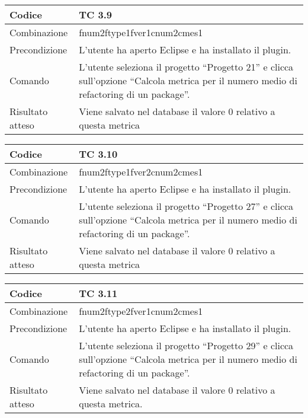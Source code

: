 \begin{table}[ht]
\begin{tabular}{|p{3cm}|p{9cm}|}
\hline
\cellcolor{lightgray}Codice				& TC 3.9								\\
\hline
\cellcolor{lightgray}Combinazione		& fnum2ftype1fver1cnum2cmes1 									\\
\hline
\cellcolor{lightgray}Precondizione		& L'utente ha aperto Eclipse e ha installato il plugin.								\\
\hline
\cellcolor{lightgray}Comando			& L'utente seleziona il progetto ``Progetto 21''  e clicca sull'opzione ``Calcola metrica per il numero medio di refactoring di un package''.	\\
\hline
\cellcolor{lightgray}Risultato atteso	& Viene salvato nel database il valore 0 relativo a questa metrica	\\
\hline
\end{tabular}
\end{table}

\begin{table}[ht]
\begin{tabular}{|p{3cm}|p{9cm}|}
\hline
\cellcolor{lightgray}Codice				& TC 3.10								\\
\hline
\cellcolor{lightgray}Combinazione		& fnum2ftype1fver2cnum2cmes1 									\\
\hline
\cellcolor{lightgray}Precondizione		& L'utente ha aperto Eclipse e ha installato il plugin.									\\
\hline
\cellcolor{lightgray}Comando			& L'utente seleziona il progetto ``Progetto 27''  e clicca sull'opzione ``Calcola metrica per il numero medio di refactoring di un package''.	\\
\hline
\cellcolor{lightgray}Risultato atteso	& Viene salvato nel database il valore 0 relativo a questa metrica	\\
\hline
\end{tabular}
\end{table}

\clearpage

\begin{table}[ht]
\begin{tabular}{|p{3cm}|p{9cm}|}
\hline
\cellcolor{lightgray}Codice				& TC 3.11								\\
\hline
\cellcolor{lightgray}Combinazione		& fnum2ftype2fver1cnum2cmes1 									\\
\hline
\cellcolor{lightgray}Precondizione		& L'utente ha aperto Eclipse e ha installato il plugin.		\\
\hline
\cellcolor{lightgray}Comando			& L'utente seleziona il progetto ``Progetto 29''  e clicca sull'opzione ``Calcola metrica per il numero medio di refactoring di un package''.	\\
\hline
\cellcolor{lightgray}Risultato atteso	& Viene salvato nel database il valore 0 relativo a questa metrica.\\
\hline
\end{tabular}
\end{table}

